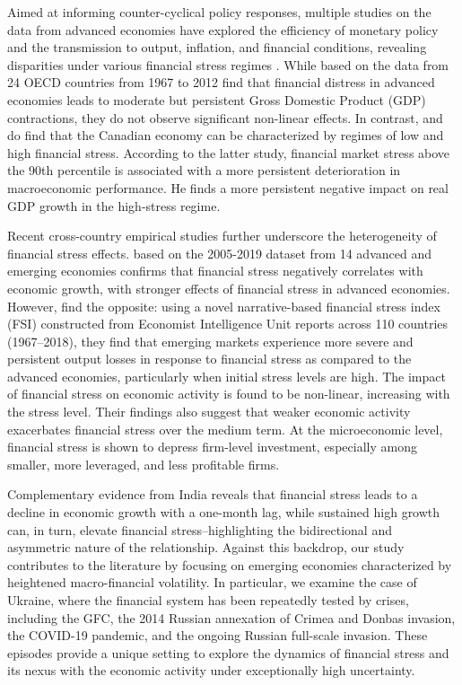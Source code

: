 \documentclass[12pt,preprint,aps,author-year]{revtex4-1}
\begin{document}
Aimed at informing counter-cyclical policy responses, multiple studies on the data from advanced economies have explored the efficiency of monetary policy and the transmission to output, inflation, and financial conditions, revealing disparities under various financial stress regimes \citep{saldias2017, fuchunli2010, floro2017, wichmann2022}. While \cite{romer2017} based on the data from 24 OECD countries from 1967 to 2012 find that financial distress in advanced economies leads to moderate but persistent Gross Domestic Product (GDP) contractions, they do not observe significant non-linear effects. In contrast, \cite{fuchunli2010} and \cite{duprey2020} do find that the Canadian economy can be characterized by regimes of low and high financial stress. According to the latter study, financial market stress above the 90th percentile is associated with a more persistent deterioration in macroeconomic performance. He finds a more persistent negative impact on real GDP growth in the high-stress regime.

Recent cross-country empirical studies further underscore the heterogeneity of financial stress effects. \cite{roncagliolo2022} based on the 2005-2019 dataset from 14 advanced and emerging economies confirms that financial stress negatively correlates with economic growth, with stronger effects of financial stress in advanced economies. However, \cite{ahir2023} find the opposite: using a novel narrative-based financial stress index (FSI) constructed from Economist Intelligence Unit reports across 110 countries (1967–2018), they find that emerging markets experience more severe and persistent output losses in response to financial stress as compared to the advanced economies, particularly when initial stress levels are high. The impact of financial stress on economic activity is found to be non-linear, increasing with the stress level. Their findings also suggest that weaker economic activity exacerbates financial stress over the medium term. At the microeconomic level, financial stress is shown to depress firm-level investment, especially among smaller, more leveraged, and less profitable firms.

Complementary evidence from India \citep{sahoo2020} reveals that financial stress leads to a decline in economic growth with a one-month lag, while sustained high growth can, in turn, elevate financial stress–highlighting the bidirectional and asymmetric nature of the relationship. Against this backdrop, our study contributes to the literature by focusing on emerging economies characterized by heightened macro-financial volatility. In particular, we examine the case of Ukraine, where the financial system has been repeatedly tested by crises, including the GFC, the 2014 Russian annexation of Crimea and Donbas invasion, the COVID-19 pandemic, and the ongoing Russian full-scale invasion. These episodes provide a unique setting to explore the dynamics of financial stress and its nexus with the economic activity under exceptionally high uncertainty.
\end{document}
